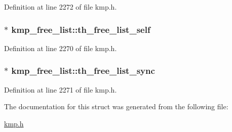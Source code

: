 Definition at line 2272 of file kmp.\-h.

\hypertarget{structkmp__free__list_a40d9e4ab1d810940d42f6aeb1284aec9}{
\subsubsection[{th\-\_\-free\-\_\-list\-\_\-self}]{$\ast$ kmp\-\_\-free\-\_\-list\-::th\-\_\-free\-\_\-list\-\_\-self}}\label{structkmp__free__list_a40d9e4ab1d810940d42f6aeb1284aec9}


Definition at line 2270 of file kmp.\-h.

\hypertarget{structkmp__free__list_a94f818b577d97fd92da4ab1a83957877}{
\subsubsection[{th\-\_\-free\-\_\-list\-\_\-sync}]{$\ast$ kmp\-\_\-free\-\_\-list\-::th\-\_\-free\-\_\-list\-\_\-sync}}\label{structkmp__free__list_a94f818b577d97fd92da4ab1a83957877}


Definition at line 2271 of file kmp.\-h.



The documentation for this struct was generated from the following file\-:\begin{DoxyCompactItemize}
\item 
\hyperlink{kmp_8h}{kmp.\-h}\end{DoxyCompactItemize}
